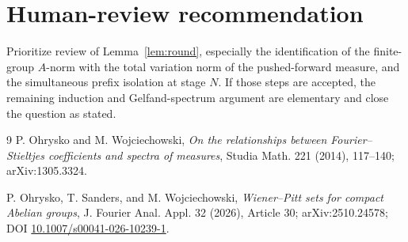 \documentclass[11pt]{article}
\begin{document}
\section{Human-review recommendation}

Prioritize review of Lemma~\ref{lem:round}, especially the identification of
the finite-group $A$-norm with the total variation norm of the pushed-forward
measure, and the simultaneous prefix isolation at stage $N$.  If those steps
are accepted, the remaining induction and Gelfand-spectrum argument are
elementary and close the question as stated.

\begin{thebibliography}{9}
P. Ohrysko and M. Wojciechowski,
\emph{On the relationships between Fourier--Stieltjes coefficients and spectra
of measures}, Studia Math. 221 (2014), 117--140; arXiv:1305.3324.

P. Ohrysko, T. Sanders, and M. Wojciechowski,
\emph{Wiener--Pitt sets for compact Abelian groups}, J. Fourier Anal. Appl.
32 (2026), Article 30; arXiv:2510.24578; DOI
\href{https://doi.org/10.1007/s00041-026-10239-1}{10.1007/s00041-026-10239-1}.
\end{thebibliography}
\end{document}
